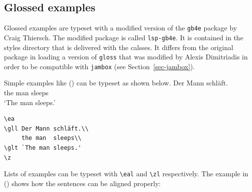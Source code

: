 \subsection{Glossed examples}

Glossed examples are typeset with a modified version of the \texttt{gb4e} package by Craig
Thiersch. The modified package is called \texttt{lsp-gb4e}. It is contained in the styles directory
that is delivered with the \lsp \latex calsses. It differs from the original package in loading a
version of \texttt{gloss} that was modified by Alexis Dimitriadis in order to be compatible with
\texttt{jambox} (see Section~\ref{sec-jambox}).

Simple examples like () can be typeset as shown below.
\ea
{}
\gll Der Mann schläft.\\
     the man  sleeps\\
\glt `The man sleeps.'
\z
\begin{verbatim}
\ea
\gll Der Mann schläft.\\
     the man  sleeps\\
\glt `The man sleeps.'
\z
\end{verbatim}
Lists of examples can be typeset with \verb+\eal+ and \verb+\zl+ respectively. The example in
() shows how the sentences can be aligned properly:
\eal
{}
\zl
\begin{fitverb}
\eal
{}
\zl
\end{fitverb}

